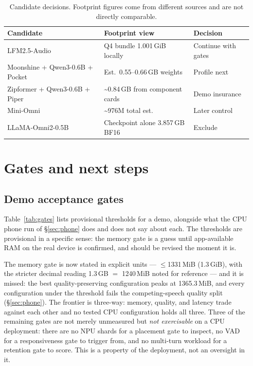 \documentclass[10pt,twocolumn,letterpaper]{article}
\begin{document}
\begin{table}[t]
\centering
\footnotesize
\setlength{\tabcolsep}{2.5pt}
\caption{Candidate decisions. Footprint figures come from different sources
and are not directly comparable.}
\label{tab:decision}
\begin{tabular}{@{}p{}p{}p{}@{}}
\toprule
\textbf{Candidate} & \textbf{Footprint view} & \textbf{Decision} \\
\midrule
LFM2.5-Audio & Q4 bundle 1.001\,GiB locally & Continue with gates \\
\addlinespace[2pt]
Moonshine + Qwen3-0.6B + Pocket & Est.\ 0.55--0.66\,GB weights & Profile next \\
\addlinespace[2pt]
Zipformer + Qwen3-0.6B + Piper & \textasciitilde0.84\,GB from component cards & Demo insurance \\
\addlinespace[2pt]
Mini-Omni~\citep{miniomni} & \textasciitilde976M total est. & Later control \\
\addlinespace[2pt]
LLaMA-Omni2-0.5B & Checkpoint alone 3.857\,GB BF16 & Exclude \\
\bottomrule
\end{tabular}
\end{table}

\section{Gates and next steps}
\label{sec:gates}

\subsection{Demo acceptance gates}

Table~\ref{tab:gates} lists provisional thresholds for a demo, alongside what
the CPU phone run of \S\ref{sec:phone} does and does not say about each. The
thresholds are provisional in a specific sense: the memory gate is a guess
until app-available RAM on the real device is confirmed, and should be revised
the moment it is.

The memory gate is now stated in explicit units --- $\leq$1331\,MiB
(1.3\,GiB), with the stricter decimal reading 1.3\,GB $=$ 1240\,MiB noted for
reference --- and it is missed: the best quality-preserving configuration
peaks at 1365.3\,MiB, and every configuration under the threshold fails the
competing-speech quality split (\S\ref{sec:phone}). The frontier is three-way:
memory, quality, and latency trade against each other and no tested CPU
configuration holds all three. Three of the remaining gates are not merely
unmeasured but \emph{not exercisable} on a CPU deployment: there are no NPU
shards for a placement gate to inspect, no VAD for a responsiveness gate to
trigger from, and no multi-turn workload for a retention gate to score. This
is a property of the deployment, not an oversight in it.
\end{document}
